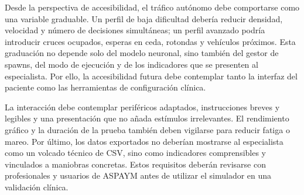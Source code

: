 Desde la perspectiva de accesibilidad, el tráfico autónomo debe comportarse como una variable graduable. Un perfil de baja dificultad debería reducir densidad, velocidad y número de decisiones simultáneas; un perfil avanzado podría introducir cruces ocupados, esperas en ceda, rotondas y vehículos próximos. Esta graduación no depende solo del modelo neuronal, sino también del gestor de spawns, del modo de ejecución y de los indicadores que se presenten al especialista. Por ello, la accesibilidad futura debe contemplar tanto la interfaz del paciente como las herramientas de configuración clínica.

La interacción debe contemplar periféricos adaptados, instrucciones breves y legibles y una presentación que no añada estímulos irrelevantes. El rendimiento gráfico y la duración de la prueba también deben vigilarse para reducir fatiga o mareo. Por último, los datos exportados no deberían mostrarse al especialista como un volcado técnico de CSV, sino como indicadores comprensibles y vinculados a maniobras concretas. Estos requisitos deberán revisarse con profesionales y usuarios de ASPAYM antes de utilizar el simulador en una validación clínica.
